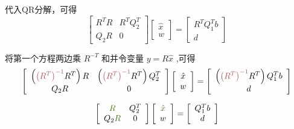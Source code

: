 代入QR分解，可得
\begin{equation}
\left[\begin{array}{cc}
R^{T} R & R^{T} Q_{2}^{T} \\
Q_{2} R & 0
\end{array}\right]\left[\begin{array}{c}
\hat{x} \\
w
\end{array}\right]=\left[\begin{array}{c}
R^{T} Q_{1}^{T} b \\
d
\end{array}\right]
\end{equation}

将第一个方程两边乘 $ R^{-T} $ 和并令变量 $ y=R \hat{x} $ ,可得
\begin{equation}\displaystyle \left[\begin{array}{ c c }
    \left(\textcolor[rgb]{0.72,0.33,0.31}{\left( R^{T}\right)^{-1}} R^{T}\right) R & \left(\textcolor[rgb]{0.72,0.33,0.31}{\left( R^{T}\right)^{-1}} R^{T}\right) Q_{2}^{T}\\
    Q_{2} R & 0
    \end{array}\right]\left[\begin{array}{ c }
    \hat{x}\\
    w
    \end{array}\right] =\left[\begin{array}{ c }
    \left(\textcolor[rgb]{0.72,0.33,0.31}{\left( R^{T}\right)^{-1}} R^{T}\right) Q_{1}^{T} b\\
    d
    \end{array}\right]\end{equation}

\begin{equation}\displaystyle \left[\begin{array}{ c c }
    \textcolor[rgb]{0.25,0.46,0.02}{R} & Q_{2}^{T}\\
    Q_{2}\textcolor[rgb]{0.25,0.46,0.02}{R} & 0
    \end{array}\right]\left[\begin{array}{ c }
    \textcolor[rgb]{0.25,0.46,0.02}{\hat{x}}\\
    w
    \end{array}\right] =\left[\begin{array}{ c }
    Q_{1}^{T} b\\
    d
    \end{array}\right]\end{equation}

